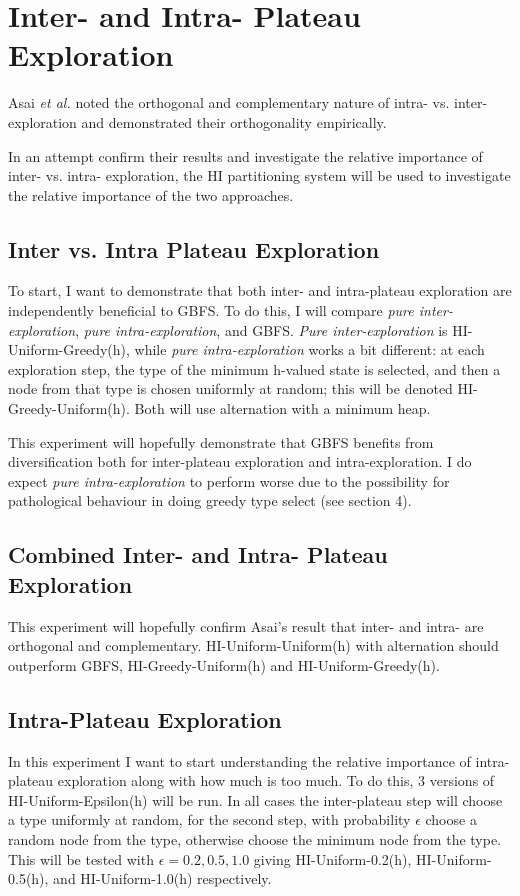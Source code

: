 \documentclass{article}
\theoremstyle{definition}
\begin{document}
\section{Inter- and Intra- Plateau Exploration}
Asai \textit{et al.} noted the orthogonal and complementary nature of intra- vs. inter-exploration and demonstrated their orthogonality empirically. 

In an attempt confirm their results and investigate the relative importance of inter- vs. intra- exploration, the HI partitioning system will be used to investigate the relative importance of the two approaches. 

\subsection{Inter vs. Intra Plateau Exploration}
To start, I want to demonstrate that both inter- and intra-plateau exploration are independently beneficial to GBFS. To do this, I will compare \textit{pure inter-exploration}, \textit{pure intra-exploration}, and GBFS. \textit{Pure inter-exploration} is HI-Uniform-Greedy(h), while \textit{pure intra-exploration} works a bit different: at each exploration step, the type of the minimum h-valued state is selected, and then a node from that type is chosen uniformly at random; this will be denoted HI-Greedy-Uniform(h). Both will use alternation with a minimum heap. 

This experiment will hopefully demonstrate that GBFS benefits from diversification both for inter-plateau exploration and intra-exploration. I do expect \textit{pure intra-exploration} to perform worse due to the possibility for pathological behaviour in doing greedy type select (see section 4). 

\subsection{Combined Inter- and Intra- Plateau Exploration}
This experiment will hopefully confirm Asai's result that inter- and intra- are orthogonal and complementary. HI-Uniform-Uniform(h) with alternation should outperform GBFS, HI-Greedy-Uniform(h) and HI-Uniform-Greedy(h).

\subsection{Intra-Plateau Exploration}
In this experiment I want to start understanding the relative importance of intra-plateau exploration along with how much is too much. To do this, 3 versions of HI-Uniform-Epsilon(h) will be run. In all cases the inter-plateau step will choose a type uniformly at random, for the second step, with probability $\epsilon$ choose a random node from the type, otherwise choose the minimum node from the type. This will be tested with $\epsilon=0.2,0.5,1.0$ giving HI-Uniform-0.2(h), HI-Uniform-0.5(h), and HI-Uniform-1.0(h) respectively.
\end{document}
